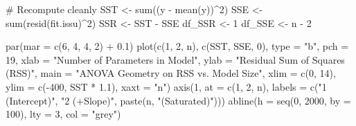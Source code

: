 \documentclass[
  letterpaper,
]{scrbook}
\newenvironment{Shaded}{\begin{snugshade}}{\end{snugshade}}
\newcommand{\AttributeTok}[1]{\textcolor[rgb]{0.40,0.45,0.13}{#1}}
\newcommand{\CommentTok}[1]{\textcolor[rgb]{0.37,0.37,0.37}{#1}}
\newcommand{\DecValTok}[1]{\textcolor[rgb]{0.68,0.00,0.00}{#1}}
\newcommand{\FloatTok}[1]{\textcolor[rgb]{0.68,0.00,0.00}{#1}}
\newcommand{\FunctionTok}[1]{\textcolor[rgb]{0.28,0.35,0.67}{#1}}
\newcommand{\NormalTok}[1]{\textcolor[rgb]{0.00,0.23,0.31}{#1}}
\newcommand{\OtherTok}[1]{\textcolor[rgb]{0.00,0.23,0.31}{#1}}
\newcommand{\SpecialCharTok}[1]{\textcolor[rgb]{0.37,0.37,0.37}{#1}}
\newcommand{\StringTok}[1]{\textcolor[rgb]{0.13,0.47,0.30}{#1}}
\begin{document}
\begin{Shaded}
\begin{Highlighting}[]
\CommentTok{\# Recompute cleanly}
\NormalTok{SST }\OtherTok{\textless{}{-}} \FunctionTok{sum}\NormalTok{((y }\SpecialCharTok{{-}} \FunctionTok{mean}\NormalTok{(y))}\SpecialCharTok{\^{}}\DecValTok{2}\NormalTok{)}
\NormalTok{SSE }\OtherTok{\textless{}{-}} \FunctionTok{sum}\NormalTok{(}\FunctionTok{resid}\NormalTok{(fit.issu)}\SpecialCharTok{\^{}}\DecValTok{2}\NormalTok{)}
\NormalTok{SSR }\OtherTok{\textless{}{-}}\NormalTok{ SST }\SpecialCharTok{{-}}\NormalTok{ SSE}
\NormalTok{df\_SSR }\OtherTok{\textless{}{-}} \DecValTok{1}
\NormalTok{df\_SSE }\OtherTok{\textless{}{-}}\NormalTok{ n }\SpecialCharTok{{-}} \DecValTok{2}

\FunctionTok{par}\NormalTok{(}\AttributeTok{mar =} \FunctionTok{c}\NormalTok{(}\DecValTok{6}\NormalTok{, }\DecValTok{4}\NormalTok{, }\DecValTok{4}\NormalTok{, }\DecValTok{2}\NormalTok{) }\SpecialCharTok{+} \FloatTok{0.1}\NormalTok{)}
\FunctionTok{plot}\NormalTok{(}\FunctionTok{c}\NormalTok{(}\DecValTok{1}\NormalTok{, }\DecValTok{2}\NormalTok{, n), }\FunctionTok{c}\NormalTok{(SST, SSE, }\DecValTok{0}\NormalTok{), }\AttributeTok{type =} \StringTok{"b"}\NormalTok{, }\AttributeTok{pch =} \DecValTok{19}\NormalTok{,}
     \AttributeTok{xlab =} \StringTok{"Number of Parameters in Model"}\NormalTok{,}
     \AttributeTok{ylab =} \StringTok{"Residual Sum of Squares (RSS)"}\NormalTok{,}
     \AttributeTok{main =} \StringTok{"ANOVA Geometry on RSS vs. Model Size"}\NormalTok{,}
     \AttributeTok{xlim =} \FunctionTok{c}\NormalTok{(}\DecValTok{0}\NormalTok{, }\DecValTok{14}\NormalTok{), }\AttributeTok{ylim =} \FunctionTok{c}\NormalTok{(}\SpecialCharTok{{-}}\DecValTok{400}\NormalTok{, SST }\SpecialCharTok{*} \FloatTok{1.1}\NormalTok{), }\AttributeTok{xaxt =} \StringTok{"n"}\NormalTok{)}
\FunctionTok{axis}\NormalTok{(}\DecValTok{1}\NormalTok{, }\AttributeTok{at =} \FunctionTok{c}\NormalTok{(}\DecValTok{1}\NormalTok{, }\DecValTok{2}\NormalTok{, n), }\AttributeTok{labels =} \FunctionTok{c}\NormalTok{(}\StringTok{"1 (Intercept)"}\NormalTok{, }\StringTok{"2 (+Slope)"}\NormalTok{, }\FunctionTok{paste}\NormalTok{(n, }\StringTok{"(Saturated)"}\NormalTok{)))}
\FunctionTok{abline}\NormalTok{(}\AttributeTok{h =} \FunctionTok{seq}\NormalTok{(}\DecValTok{0}\NormalTok{, }\DecValTok{2000}\NormalTok{, }\AttributeTok{by =} \DecValTok{100}\NormalTok{), }\AttributeTok{lty =} \DecValTok{3}\NormalTok{, }\AttributeTok{col =} \StringTok{"grey"}\NormalTok{)}


\end{Highlighting}
\end{Shaded}
\end{document}
